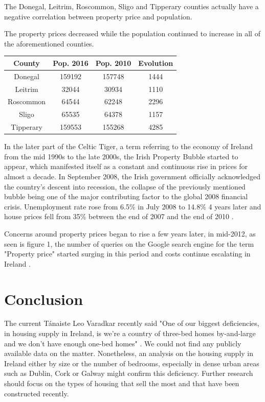 \documentclass[twocolumn]{article}
\begin{document}
The Donegal, Leitrim, Roscommon, Sligo and Tipperary counties actually have a
negative correlation between property price and population.

The property prices decreased while the population continued to increase in all of the aforementioned counties.

\begin{center}
\begin{tabular}{||c c c c||}
 \hline
 County & Pop. 2016 & Pop. 2010 & Evolution \\ [0.5ex]
 \hline\hline
 Donegal & 159192 & 157748 & 1444 \\
 \hline
 Leitrim & 32044 & 30934 & 1110 \\
 \hline
 Roscommon & 64544 & 62248 & 2296 \\
 \hline
 Sligo & 65535 & 64378 & 1157 \\
 \hline
 Tipperary & 159553 & 155268 & 4285 \\ [1ex]
 \hline
\end{tabular}
\end{center}

In the later part of the Celtic Tiger, a term referring to the economy of Ireland from the mid 1990s to the late 2000s, the Irish Property Bubble started to appear, which manifested itself as a constant and continuous rise in prices for almost a decade. In September 2008, the Irish government officially acknowledged the country's descent into recession\cite{kollewe08}, the collapse of the previously mentioned bubble being one of the major contributing factor to the global 2008 financial crisis. Unemployment rate rose from 6.5\% in July 2008 to 14.8\% 4 years later \cite{cso14} and house prices fell from 35\% between the end of 2007 and the end of 2010 \cite{environ10}.

Concerns around property prices began to rise a few years later, in mid-2012, as seen is figure 1, the number of queries on the Google search engine for the term "Property price" started surging in this period and costs continue escalating in Ireland \cite{kennedy21}.

\section{Conclusion}
The current Tánaiste Leo Varadkar recently said "One of our biggest deficiencies, in housing supply in Ireland, is we're a country of three-bed homes by-and-large and we don't have enough one-bed homes" \cite{mcgrath21}. We could not find any publicly available data on the matter. Nonetheless, an analysis on the housing supply in Ireland either by size or the number of bedrooms, especially in dense urban areas such as Dublin, Cork or Galway might confirm this deficiency. Further research should focus on the types of housing that sell the most and that have been constructed recently.
\end{document}
